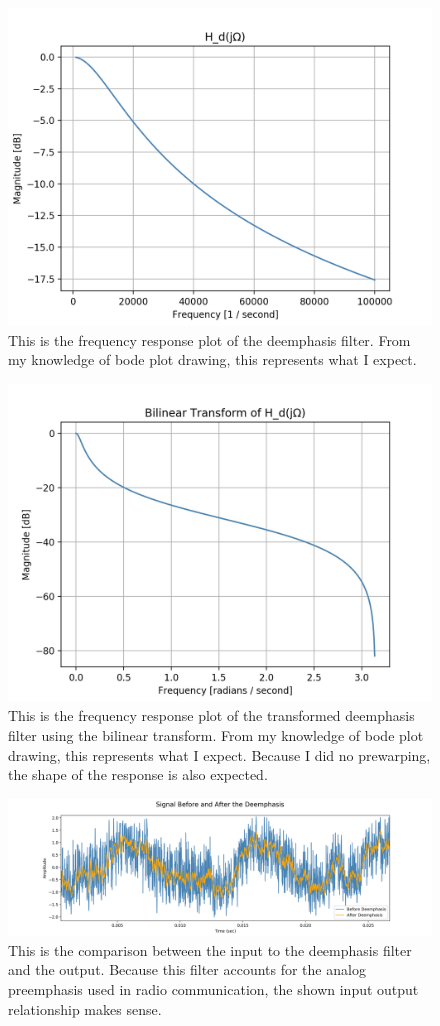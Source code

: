 \documentclass{article}
\begin{document}
\begin{figure}[h] \label{fig:deemphasis_1}
    \centering
    \includegraphics[width=.5\textwidth]{h_d.png}
    \caption{This is the frequency response plot of the deemphasis filter. From my knowledge of bode plot drawing, this represents what I expect.}
\end{figure}

\begin{figure}[h] \label{fig:deemphasis_2}
    \centering
    \includegraphics[width=.5\textwidth]{bilinear.jpg}
        \caption{This is the frequency response plot of the transformed deemphasis filter using the bilinear transform. From my knowledge of bode plot drawing, this represents what I expect. Because I did no prewarping, the shape of the response is also expected.}
\end{figure}

\begin{figure}[h] \label{fig:deemphasis_3}
    \centering
    \includegraphics[width=\textwidth]{deemphasis.png}
    \caption{This is the comparison between the input to the deemphasis filter and the output. Because this filter accounts for the analog preemphasis used in radio communication, the shown input output relationship makes sense.}
\end{figure}
\end{document}
